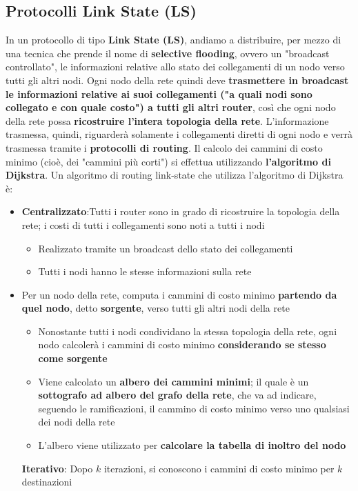 \documentclass[12pt]{article}
\begin{document}
\subsection{Protocolli Link State (LS)}
In un protocollo di tipo \textbf{Link State (LS)}, andiamo a distribuire, per mezzo di una tecnica che prende il nome di \textbf{selective flooding}, ovvero un "broadcast controllato", le informazioni relative
allo stato dei collegamenti di un nodo verso tutti gli altri nodi. Ogni nodo della rete quindi deve \textbf{trasmettere in broadcast le informazioni relative ai suoi collegamenti ("a quali nodi sono collegato e con quale costo") a tutti gli altri router}, così che ogni
nodo della rete possa \textbf{ricostruire l'intera topologia della rete}. L'informazione trasmessa, quindi, riguarderà solamente i collegamenti diretti di ogni nodo e verrà trasmessa tramite i \textbf{protocolli di routing}.
Il calcolo dei cammini di costo minimo (cioè, dei "cammini più corti") si effettua utilizzando \textbf{l'algoritmo di Dijkstra}.
Un algoritmo di routing link-state che utilizza l'algoritmo di Dijkstra è:
\begin{itemize}
    \item \textbf{Centralizzato}:Tutti i router sono in grado di ricostruire la topologia della rete; i costi di tutti i collegamenti sono noti a tutti i nodi
    \begin{itemize}
        \item Realizzato tramite un broadcast dello stato dei collegamenti
        \item Tutti i nodi hanno le stesse informazioni sulla rete
    \end{itemize}
    \item Per un nodo della rete, computa i cammini di costo minimo \textbf{partendo da quel nodo}, detto \textbf{sorgente}, verso tutti gli altri nodi della rete
    \begin{itemize}
        \item Nonostante tutti i nodi condividano la stessa topologia della rete, ogni nodo calcolerà i cammini di costo minimo \textbf{considerando se stesso come sorgente}
        \item Viene calcolato un \textbf{albero dei cammini minimi}; il quale è un \textbf{sottografo ad albero del grafo della rete}, che va ad indicare, seguendo le ramificazioni, il cammino di costo minimo verso uno qualsiasi dei nodi della rete  
        \item L'albero viene utilizzato per \textbf{calcolare la tabella di inoltro del nodo}
    \end{itemize}
    \textbf{Iterativo}: Dopo $k$ iterazioni, si conoscono i cammini di costo minimo per $k$ destinazioni
\end{itemize}
\end{document}
